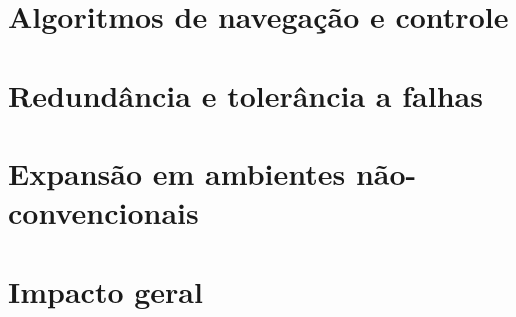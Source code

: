 \documentclass[a4paper,12pt]{article}
\begin{document}








\section{Algoritmos de navegação e controle}



% 





\section{Redundância e tolerância a falhas}



\section{Expansão em ambientes não-convencionais}





\section{Impacto geral}




%

\end{document}
